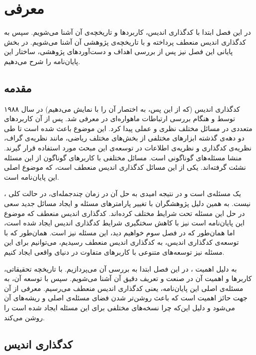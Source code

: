\chapter{معرفی}
\label{chapter:introduction}
 در این فصل ابتدا با کدگذاری اندیس، کاربردها و تاریخچه‌ی آن آشنا می‌شویم. سپس به کدگذاری اندیس منعطف پرداخته و با تاریخچه‌ی پژوهشی آن آشنا می‌شویم. در بخش پایانی این فصل نیز پس از بررسی اهداف و دست‌آوردهای پژوهشی، ساختار این پایان‌نامه را شرح می‌دهیم.
\pagebreak

\section{مقدمه}
کدگذاری اندیس (که از این پس، به اختصار آن را با
\icod
نمایش می‌دهیم) در سال ۱۹۸۸ توسط 
و
هنگام بررسی ارتباطات ماهواره‌ای در
\cite{25}
معرفی شد. پس از آن \icod کاربردهای متعددی در مسائل مختلف نظری و عملی پیدا کرد. این موضوع باعث شده است تا طی دو دهه‌ی گذشته ابزارهای مختلفی از بخش‌های مختلف ریاضی، مانند نظریه‌ی گراف، نظریه‌ی کدگذاری و نظریه‌ی اطلاعات در توسعه‌ی این مبحث مورد استفاده قرار گیرند. \icod منشا مسئله‌های گوناگونی است. مسائل مختلفی با کاربرهای گوناگون از این مسئله نشئت گرفته‌اند. یکی از این مسائل کدگذاری اندیس منعطف است، که موضوع اصلی این پایان‌نامه است.

	\icods، یک مسئله‌ی
است و در نتیجه امیدی به حل آن در زمان چندجمله‌ای، در حالت کلی نیست. به همین دلیل پژوهشگران با تغییر پارامترهای مسئله و ایجاد مسائل جدید سعی در حل این مسئله تحت شرایط مختلف کرده‌اند. کدگذاری اندیس منعطف که موضوع این پایان‌نامه است نیز با کاهش سختگیری شرایط کدگذاری اندیس ایجاد شده است، اما همان‌طور که در فصل سوم خواهیم دید، این مسئله نیز
\nphard
است. همان‌طور که با توسعه‌ی کدگذاری اندیس، به کدگذاری اندیس منعطف رسیدیم، می‌توانیم برای  این مسئله نیز توسعه‌های متنوعی با کاربرهای متفاوت در دنیای واقعی ایجاد کنیم.

به دلیل اهمیت \icods، در این فصل ابتدا به بررسی آن می‌پردازیم. با تاریخچه تحقیقاتی، کاربرها و اهمیت آن در صنعت و تعریف دقیق آن آشنا می‌شویم. سپس با توسعه آن، به مسئله‌ی اصلی این پایان‌نامه، یعنی کدگذاری اندیس منعطف می‌رسیم. معرفی \icod از آن جهت حائز اهمیت است که باعث روشن‌تر شدن فضای مسئله‌‌ی اصلی و ریشه‌های آن می‌شود و دلیل این‌که چرا نسخه‌های مختلفی برای این مسئله ایجاد شده است را روشن می‌کند.
\pagebreak
\section{کدگذاری اندیس}
